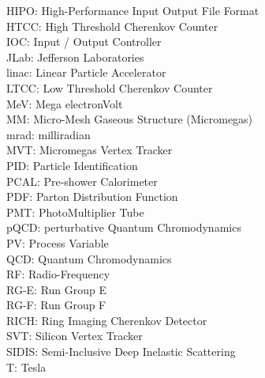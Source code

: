 {    HIPO:      High-Performance Input Output File Format \\
    HTCC:      High Threshold Cherenkov Counter \\
    IOC:       Input / Output Controller \\
    JLab:      Jefferson Laboratories \\
    linac:     Linear Particle Accelerator \\
    LTCC:      Low Threshold Cherenkov Counter \\
    MeV:       Mega electronVolt \\
    MM:        Micro-Mesh Gaseous Structure (Micromegas) \\
    mrad:      milliradian \\
    MVT:       Micromegas Vertex Tracker \\
    PID:       Particle Identification \\
    PCAL:      Pre-shower Calorimeter \\
    PDF:       Parton Distribution Function \\
    PMT:       PhotoMultiplier Tube \\
    pQCD:      perturbative Quantum Chromodynamics \\
    PV:        Process Variable \\
    QCD:       Quantum Chromodynamics \\
    RF:        Radio-Frequency \\
    RG-E:      Run Group E \\
    RG-F:      Run Group F \\
    RICH:      Ring Imaging Cherenkov Detector \\
    SVT:       Silicon Vertex Tracker \\
    SIDIS:     Semi-Inclusive Deep Inelastic Scattering \\
    T:         Tesla
}
